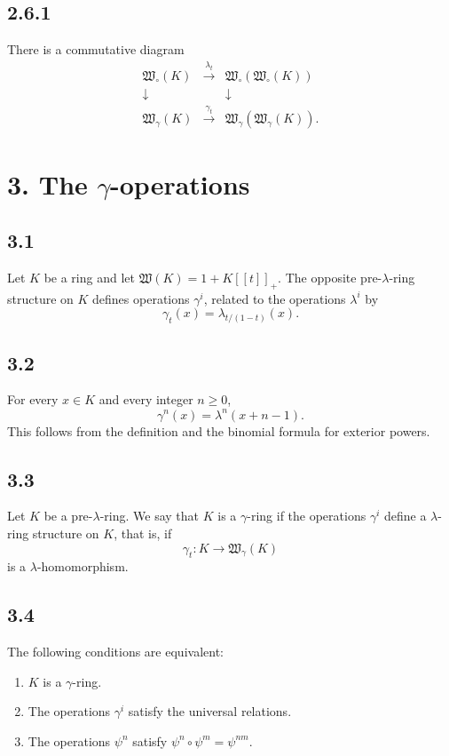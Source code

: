 \documentclass[13pt]{extarticle}
\begin{document}
\subsection*{2.6.1}
There is a commutative diagram
\[
\begin{array}{ccc}
\mathfrak W_\circ(K) & \xrightarrow{\lambda_t} & \mathfrak W_\circ(\mathfrak W_\circ(K))\\
\downarrow && \downarrow\\
\mathfrak W_\gamma(K) & \xrightarrow{\gamma_t} & \mathfrak W_\gamma(\mathfrak W_\gamma(K)).
\end{array}
\]

\section*{3. The $\gamma$-operations}

\subsection*{3.1}
Let $K$ be a ring and let $\mathfrak W(K)=1+K[[t]]_+$. The opposite pre-$\lambda$-ring structure on $K$ defines operations $\gamma^i$, related to the operations $\lambda^i$ by
\begin{equation}\label{eq:3.1}
\gamma_t(x)=\lambda_{t/(1-t)}(x).
\end{equation}

\subsection*{3.2}
For every $x\in K$ and every integer $n\geq 0$,
\begin{equation}\label{eq:3.2}
\gamma^n(x)=\lambda^n(x+n-1).
\end{equation}
This follows from the definition and the binomial formula for exterior powers.

\subsection*{3.3}
Let $K$ be a pre-$\lambda$-ring. We say that $K$ is a $\gamma$-ring if the operations $\gamma^i$ define a $\lambda$-ring structure on $K$, that is, if
\[
\gamma_t:K\longrightarrow \mathfrak W_\gamma(K)
\]
is a $\lambda$-homomorphism.

\subsection*{3.4}
The following conditions are equivalent:
\begin{enumerate}[label=(\roman*)]
\item $K$ is a $\gamma$-ring.
\item The operations $\gamma^i$ satisfy the universal relations.
\item The operations $\psi^n$ satisfy $\psi^n\circ\psi^m=\psi^{nm}$.
\end{enumerate}
\end{document}
